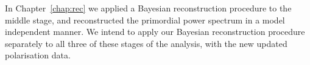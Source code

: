 \begin{center}
\end{center}

In Chapter~\ref{chap:rec} we applied a Bayesian reconstruction procedure to the middle stage, and reconstructed the primordial power spectrum in a model independent manner.  
We intend to apply our Bayesian reconstruction procedure separately to all three of these stages of the analysis, with the new updated polarisation data.
